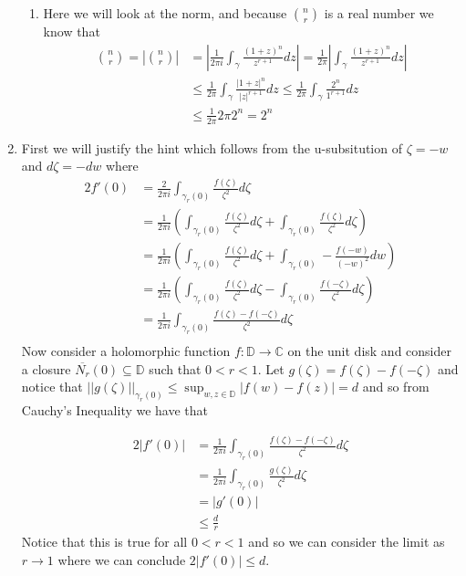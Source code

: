 \documentclass[12pt]{amsart}
\theoremstyle{definition}
\newcommand{\C}{\mathbb{C}}
\newcommand{\ra}{\rightarrow}
\newcommand{\se}{\subseteq}
\begin{document}
\begin{enumerate}
\begin{enumerate}
\item Here we will look at the norm, and because ${n\choose r}$ is a real number we know that
\begin{align*}
    {n\choose r}=\left|{n\choose r}\right|&=\left|\frac{1}{2\pi i}\int_{\gamma}\frac{(1+z)^n}{z^{r+1}}dz\right|=\frac{1}{2\pi}\left|\int_{\gamma}\frac{(1+z)^n}{z^{r+1}}dz\right|\\
    &\leq \frac{1}{2\pi}\int_{\gamma}\frac{|1+z|^n}{|z|^{r+1}}dz\leq \frac{1}{2\pi}\int_{\gamma}\frac{2^n}{1^{r+1}}dz\\
    &\leq \frac{1}{2\pi}2\pi2^n=2^n
\end{align*}

\end{enumerate}

\item %
First we will justify the hint which follows from the u-subsitution of $\zeta=-w$ and $d\zeta=-dw$ where
\begin{align*}
    2f'(0)&=\frac{2}{2\pi i}\int_{\gamma_r(0)}\frac{f(\zeta)}{\zeta^2}d\zeta\\
    &=\frac{1}{2\pi i}\left(\int_{\gamma_r(0)}\frac{f(\zeta)}{\zeta^2}d\zeta+\int_{\gamma_r(0)}\frac{f(\zeta)}{\zeta^2}d\zeta\right)\\
    &=\frac{1}{2\pi i}\left(\int_{\gamma_r(0)}\frac{f(\zeta)}{\zeta^2}d\zeta+\int_{\gamma_r(0)}-\frac{f(-w)}{(-w)^2}dw\right)\\
    &=\frac{1}{2\pi i}\left(\int_{\gamma_r(0)}\frac{f(\zeta)}{\zeta^2}d\zeta-\int_{\gamma_r(0)}\frac{f(-\zeta)}{\zeta^2}d\zeta\right)\\
    &=\frac{1}{2\pi i}\int_{\gamma_r(0)}\frac{f(\zeta)-f(-\zeta)}{\zeta^2}d\zeta\\
\end{align*}
Now consider a holomorphic function $f:\mathbb{D}\ra \C$ on the unit disk and consider a closure $\overline{N_r}(0)\se \mathbb{D}$ such that $0< r< 1$. Let $g(\zeta)=f(\zeta)-f(-\zeta)$ and notice that $||g(\zeta)||_{\gamma_r(0)}\leq \sup_{w,z\in\mathbb{D}}|f(w)-f(z)|=d$ and so from Cauchy's Inequality we have that 

\begin{align*}
    2|f'(0)|&=\frac{1}{2\pi i}\int_{\gamma_r(0)}\frac{f(\zeta)-f(-\zeta)}{\zeta^2}d\zeta\\
    &=\frac{1}{2\pi i}\int_{\gamma_r(0)}\frac{g(\zeta)}{\zeta^2}d\zeta\\
    &=|g'(0)|\\
    &\leq \frac{d}{r}
\end{align*}
Notice that this is true for all $0<r<1$ and so we can consider the limit as $r\ra 1$ where we can conclude $2|f'(0)|\leq d$.\\


\end{enumerate}
\end{document}
